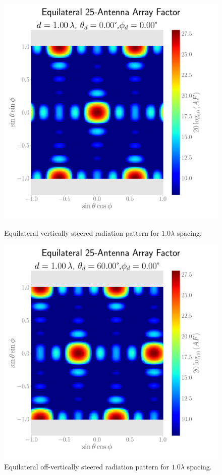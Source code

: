 \begin{figure}[H]
  \begin{minipage}[t]{0.45\textwidth}
    \centering
    \includegraphics[width=\textwidth]{graphics/task_3/equilat-1.00-lambda-0.00-theta-0.00-phi-radpat.pdf}
    \caption{Equilateral vertically steered radiation pattern for $1.0\lambda$ spacing.}\label{fig:rad-equilat-1.0-0}
  \end{minipage}\hfill
  \begin{minipage}[t]{0.45\textwidth}
    \centering
    \includegraphics[width=\textwidth]{graphics/task_3/equilat-1.00-lambda-60.00-theta-0.00-phi-radpat.pdf}
    \caption{Equilateral off-vertically steered radiation pattern for $1.0\lambda$ spacing.}\label{fig:rad-equilat-1.0-60}
   \end{minipage}
\end{figure}

